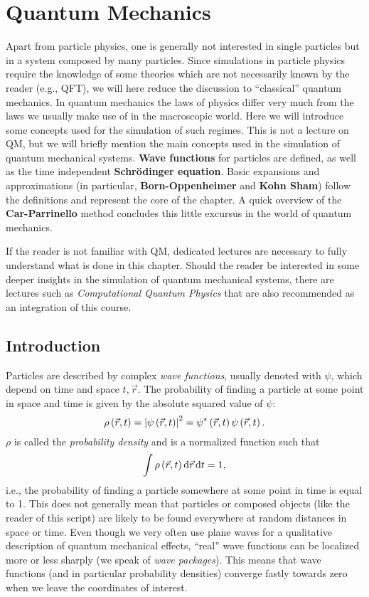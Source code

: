 \chapter{Quantum Mechanics}


Apart from particle physics, one is generally not interested in single particles but in a system composed by many particles.  Since simulations in particle physics require the knowledge of some theories which are not necessarily known by the reader (e.g., QFT), we will here reduce the discussion to ``classical'' quantum mechanics. In quantum mechanics the laws of physics differ very much from the laws we usually make use of in the macroscopic world. Here we will introduce some concepts used for the simulation of such regimes. This is not a lecture on QM, but we will briefly mention the main concepts used in the simulation of quantum mechanical systems. \textbf{Wave functions} for particles are defined, as well as the time independent \textbf{ Schr\"odinger equation}.  Basic expansions and approximations (in particular, \textbf{Born-Oppenheimer} and \textbf{Kohn Sham}) follow the definitions and represent the core of the chapter. A quick overview of the \textbf{Car-Parrinello} method concludes this little excursus in the world of quantum mechanics.

If the reader is not familiar with QM, dedicated lectures are necessary to fully understand what is done in this chapter. Should the reader be interested in some deeper insights in the simulation of quantum mechanical systems, there are lectures such as \emph{Computational Quantum Physics} that are also recommended as an integration of this course.

\section{Introduction}

Particles are described by complex \emph{wave functions}, usually denoted with $\psi$, which depend on time and space $t,\vec{r}$. The probability of finding a particle at some point in space and time is given by the absolute squared value of $\psi$:
\begin{equation}
\rho\left(\vec{r},t\right) = \left|\psi\left(\vec{r},t\right)\right|^2 = \psi^*\left(\vec{r},t\right)\psi\left(\vec{r},t\right).
\end{equation}
$\rho$ is called the \emph{probability density} and is a normalized function such that
\begin{equation}
\int \rho\left(\vec{r},t\right) \text{d}\vec{r}\,\text{d}t = 1,
\end{equation}
i.e., the probability of finding a particle somewhere at some point in time is equal to 1. This does not generally mean that particles or composed objects (like the reader of this script) are likely to be found everywhere at random distances in space or time. Even though we very often use plane waves for a qualitative description of quantum mechanical effects, ``real'' wave functions can be localized more or less sharply (we speak of \emph{wave packages}). This means that wave functions (and in particular probability densities) converge fastly towards zero when we leave the coordinates of interest.



